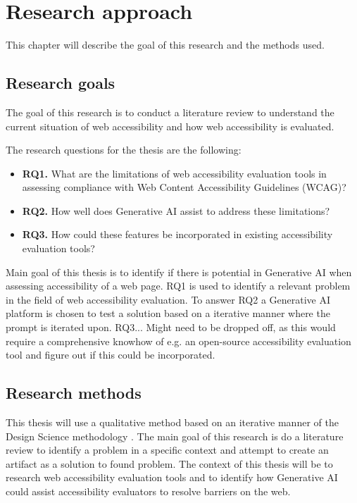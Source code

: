 \chapter{Research approach\label{methods}}

This chapter will describe the goal of this research and the methods used. 

\section{Research goals}

The goal of this research is to conduct a literature review to understand the current situation of web accessibility and how web accessibility is evaluated.

The research questions for the thesis are the following:

\begin{itemize}
    \item \textbf{RQ1.} What are the limitations of web accessibility evaluation tools in assessing compliance with Web Content Accessibility Guidelines (WCAG)?
    \item \textbf{RQ2.} How well does Generative AI assist to address these limitations?
    \item \textbf{RQ3.} How could these features be incorporated in existing accessibility evaluation tools?
\end{itemize}

Main goal of this thesis is to identify if there is potential in Generative AI when assessing accessibility of a web page. RQ1 is used to identify a relevant problem in the field of web accessibility evaluation. To answer RQ2 a Generative AI platform is chosen to test a solution based on a iterative manner where the prompt is iterated upon. RQ3... Might need to be dropped off, as this would require a comprehensive knowhow of e.g. an open-source accessibility evaluation tool and figure out if this could be incorporated.

\section{Research methods}

This thesis will use a qualitative method based on an iterative manner of the Design Science methodology \citep{designsciencemethodology, iterativedesignscience}. The main goal of this research is do a literature review to identify a problem in a specific context and attempt to create an artifact as a solution to found problem. The context of this thesis will be to research web accessibility evaluation tools and to identify how Generative AI could assist accessibility evaluators to resolve barriers on the web. 


